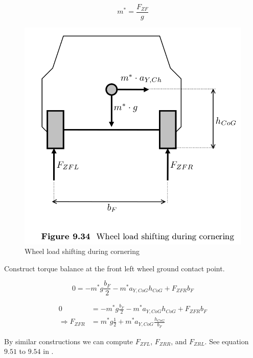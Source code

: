 \begin{equation}
  m^* = \frac{F_{ZF}}{g}
\end{equation}


\begin{figure}
    \centering
    \includegraphics[width=\textwidth]{draft/stolen-figures/wheel-load-shifting-cornering.png}
    \caption{Wheel load shifting during cornering}
    \label{fig:wheel-load-shifting-during-cornering}
\end{figure}

Construct torque balance at the front left wheel ground contact point. 

\begin{equation}
  0 = -m^* g \frac{b_F}{2} - m^* a_{Y,CoG} h_{CoG} + F_{ZFR} b_F
\end{equation}

\begin{align}
  0 &= -m^* g \frac{b_F}{2} - m^* a_{Y,CoG} h_{CoG} + F_{ZFR} b_F \\
  \Rightarrow F_{ZFR} &= m^* g \frac{1}{2} + m^* a_{Y,CoG} \frac{h_{CoG}}{b_F}
\end{align}

By similar constructions we can compute $F_{ZFL}$, $F_{ZRR}$, and $F_{ZRL}$. See equation $9.51$ to $9.54$ in \cite{kiencke}.







